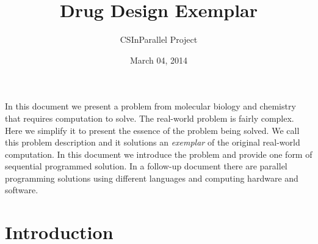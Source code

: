 \documentclass[letterpaper,10pt,openany,oneside]{sphinxmanual}
\title{Drug Design Exemplar}
\date{March 04, 2014}
\author{CSInParallel Project}
\begin{document}
\maketitle
\tableofcontents
{}\label{index::doc}


In this document we present a problem from molecular biology and chemistry that requires computation to solve.  The real-world problem is fairly complex.  Here we simplify it to present the essence of the problem being solved.  We call this problem description and it solutions an \emph{exemplar} of the original real-world computation.  In this document we introduce the problem and provide one form of sequential programmed solution.  In a follow-up document there are parallel programming solutions using different languages and computing hardware and software.


\chapter{Introduction}
\label{intro/intro:introduction}\label{intro/intro:drug-design-exemplar}\label{intro/intro::doc}
\end{document}
